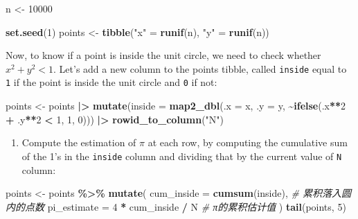 \documentclass[
]{article}
\newenvironment{Shaded}{\begin{snugshade}}{\end{snugshade}}
\newcommand{\AttributeTok}[1]{\textcolor[rgb]{0.13,0.29,0.53}{#1}}
\newcommand{\CommentTok}[1]{\textcolor[rgb]{0.56,0.35,0.01}{\textit{#1}}}
\newcommand{\DecValTok}[1]{\textcolor[rgb]{0.00,0.00,0.81}{#1}}
\newcommand{\FunctionTok}[1]{\textcolor[rgb]{0.13,0.29,0.53}{\textbf{#1}}}
\newcommand{\NormalTok}[1]{#1}
\newcommand{\OtherTok}[1]{\textcolor[rgb]{0.56,0.35,0.01}{#1}}
\newcommand{\SpecialCharTok}[1]{\textcolor[rgb]{0.81,0.36,0.00}{\textbf{#1}}}
\newcommand{\StringTok}[1]{\textcolor[rgb]{0.31,0.60,0.02}{#1}}
\providecommand{\tightlist}{%
  \setlength{\itemsep}{0pt}\setlength{\parskip}{0pt}}
\begin{document}
\begin{Shaded}
\begin{Highlighting}[]
\NormalTok{n }\OtherTok{\textless{}{-}} \DecValTok{10000}

\FunctionTok{set.seed}\NormalTok{(}\DecValTok{1}\NormalTok{)}
\NormalTok{points }\OtherTok{\textless{}{-}} \FunctionTok{tibble}\NormalTok{(}\StringTok{"x"} \OtherTok{=} \FunctionTok{runif}\NormalTok{(n), }\StringTok{"y"} \OtherTok{=} \FunctionTok{runif}\NormalTok{(n))}
\end{Highlighting}
\end{Shaded}

Now, to know if a point is inside the unit circle, we need to check
whether \(x^2 + y^2 < 1\). Let's add a new column to the points tibble,
called \texttt{inside} equal to \texttt{1} if the point is inside the
unit circle and \texttt{0} if not:

\begin{Shaded}
\begin{Highlighting}[]
\NormalTok{points }\OtherTok{\textless{}{-}}\NormalTok{ points }\SpecialCharTok{|\textgreater{}}
\FunctionTok{mutate}\NormalTok{(}\AttributeTok{inside =} \FunctionTok{map2\_dbl}\NormalTok{(}\AttributeTok{.x =}\NormalTok{ x, }\AttributeTok{.y =}\NormalTok{ y, }\SpecialCharTok{\textasciitilde{}}\FunctionTok{ifelse}\NormalTok{(.x}\SpecialCharTok{**}\DecValTok{2} \SpecialCharTok{+}\NormalTok{ .y}\SpecialCharTok{**}\DecValTok{2} \SpecialCharTok{\textless{}} \DecValTok{1}\NormalTok{, }\DecValTok{1}\NormalTok{, }\DecValTok{0}\NormalTok{))) }\SpecialCharTok{|\textgreater{}}
\FunctionTok{rowid\_to\_column}\NormalTok{(}\StringTok{"N"}\NormalTok{)}
\end{Highlighting}
\end{Shaded}

\begin{enumerate}
\def\labelenumi{\alph{enumi}.}
\tightlist
\item
  Compute the estimation of \(\pi\) at each row, by computing the
  cumulative sum of the 1's in the \texttt{inside} column and dividing
  that by the current value of \texttt{N} column:
\end{enumerate}

\begin{Shaded}
\begin{Highlighting}[]
\NormalTok{points }\OtherTok{\textless{}{-}}\NormalTok{ points }\SpecialCharTok{\%\textgreater{}\%}
  \FunctionTok{mutate}\NormalTok{(}
    \AttributeTok{cum\_inside =} \FunctionTok{cumsum}\NormalTok{(inside),  }\CommentTok{\# 累积落入圆内的点数}
    \AttributeTok{pi\_estimate =} \DecValTok{4} \SpecialCharTok{*}\NormalTok{ cum\_inside }\SpecialCharTok{/}\NormalTok{ N  }\CommentTok{\# π的累积估计值}
\NormalTok{  )}
\FunctionTok{tail}\NormalTok{(points, }\DecValTok{5}\NormalTok{)}
\end{Highlighting}
\end{Shaded}
\end{document}

